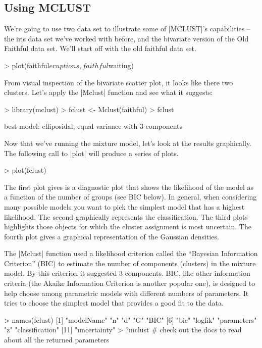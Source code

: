 \subsection{Using MCLUST}

We're going to use two data set to illustrate some of |MCLUST|'s capabilities -- the iris data set we've worked with before, and the bivariate version of the Old Faithful data set. We'll start off with  the old faithful data set.

\begin{R}
> plot(faithful$eruptions, faithful$waiting)
\end{R}

From visual inspection of the bivariate scatter plot, it looks like there two clusters. Let's apply the |Mclust| function and see what it suggests:

\begin{R}
> library(mclust)
> fclust <- Mclust(faithful)
> fclust

 best model: elliposidal, equal variance with 3 components
\end{R}

Now that we've running the mixture model, let's look at the results graphically. The following call to |plot| will produce a series of plots.

\begin{R}
> plot(fclust)
\end{R}

The first plot gives is a diagnostic plot that shows the likelihood of the model as a function of  the number of groups (see BIC below). In general, when considering many possible models you want to pick the simplest model that has a highest likelihood. The second graphically represents the classification. The third plots highlights those objects for which the cluster assignment is most uncertain. The fourth plot gives a graphical representation of the Gaussian densities.

The |Mclust| function used a likelihood criterion called the ``Bayesian Information Criterion'' (BIC) to estimate the number of components (clusters) in the mixture model. By this criterion it suggested 3 components. BIC, like other information criteria (the Akaike Information Criterion is another popular one), is designed to help choose among parametric models with different numbers of parameters. It tries to choose the simplest model that provides a good fit to the data.

\begin{R}
> names(fclust)
 [1] "modelName"      "n"              "d"              "G"              "BIC"
 [6] "bic"            "loglik"         "parameters"     "z"              "classification"
[11] "uncertainty"
> ?mclust  # check out the docs to read about all the returned parameters
\end{R}

